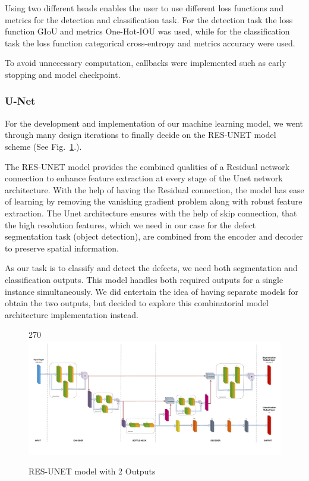 \documentclass[12pt]{article}
\begin{document}
Using two different heads enables the user to use different loss functions and metrics for the detection and classification task. 
For the detection task the loss function GIoU and metrics One-Hot-IOU was used, while for the classification task the loss function categorical cross-entropy and metrics accuracy were used.

To avoid unnecessary computation, callbacks were implemented such as early stopping and model checkpoint. 

\clearpage
\newpage

\subsubsection{U-Net}
For the development and implementation of our machine learning model, we went through many design iterations to finally decide on the RES-UNET model scheme (See Fig.~\ref{fig:resunetmodel}.).

The RES-UNET model provides the combined qualities of a Residual network connection to enhance feature extraction at every stage of the Unet network architecture. With the help of having the Residual connection, the model has ease of learning by removing the vanishing gradient problem along with robust feature extraction. The Unet architecture ensures with the help of skip connection, that the high resolution features, which we need in our case for the defect segmentation task (object detection), are combined from the encoder and decoder to preserve spatial information.

As our task is to classify and detect the defects, we need both segmentation and classification outputs. This model handles both required outputs for a single instance simultaneously. We did entertain the idea of having separate models for obtain the two outputs, but decided to explore this combinatorial model architecture implementation instead.

\begin{figure}[p]
    \centering
    \begin{turn}{270}
    \includegraphics[width=1.2\paperwidth,height=1.2\paperheight,keepaspectratio]{./graphics/model-unet.png}
    \end{turn}
    \caption{RES-UNET model with 2 Outputs}
    \label{fig:resunetmodel}
\end{figure}
\restoregeometry
\end{document}
